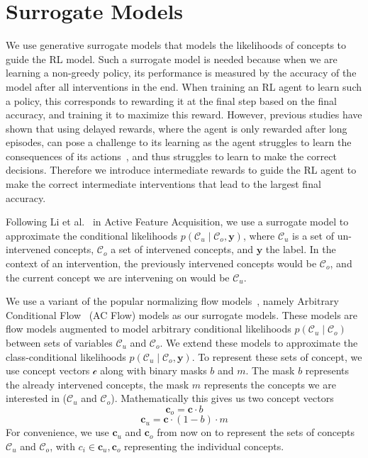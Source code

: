 
\section{Surrogate Models}\label{method:surrogate}

We use generative surrogate models that models the likelihoods of concepts
to guide the RL model. 
Such a surrogate model is needed because
when we are learning
a non-greedy policy, its performance is measured by the accuracy
of the model after all interventions in the end.
When training an RL agent to learn such a policy, this corresponds
to rewarding it at the final step based 
on the final accuracy, and training it to maximize this reward.
However, previous studies have shown that
using delayed rewards, where the agent is only rewarded after long episodes,
can pose a challenge to its learning as the agent struggles to learn
the consequences of its actions~\cite{ steps-towards-ai, temporal-credit-assignment},
and thus struggles to learn to make the correct decisions.
Therefore we introduce intermediate rewards 
to guide the RL agent to make the correct intermediate
interventions that lead 
to the largest final accuracy.

Following Li et al.~\cite{afa} in Active Feature Acquisition,
we use a surrogate model 
to approximate
the conditional likelihoods $p(\mathcal{C}_u \mid \mathcal{C}_o, \mathbf{y})$, 
where $\mathcal{C}_u$ is a set of un-intervened
concepts, $\mathcal{C}_o$ a set of intervened concepts,
and $\mathbf{y}$ the label. 
In the context of an intervention, the previously intervened concepts would be $\mathcal{C}_o$,
and the current concept we are intervening on would be
$\mathcal{C}_u$.

We use a variant of the popular normalizing flow models~\cite{normalizing-flows},
namely Arbitrary Conditional Flow~\cite{acflow} (AC Flow)
models as our surrogate models.
These models are 
flow models augmented to model arbitrary conditional likelihoods $p(\mathcal{C}_u \mid \mathcal{C}_o)$
between sets of variables $\mathcal{C}_u$ and $\mathcal{C}_o$.
We extend these models to approximate the class-conditional
likelihoods
$p(\mathcal{C}_u \mid \mathcal{C}_o, \mathbf{y})$. To represent
these sets of concept,
we use concept vectors $\mathcal{c}$ along with
binary masks $b$ and $m$.
The mask $b$ represents
the already intervened concepts, the mask $m$ represents
the concepts we are interested in ($\mathcal{C}_u$ and $\mathcal{C}_o$).
Mathematically this gives us two concept vectors
\[\mathbf{c}_o = \mathbf{c} \cdot b\]
\[\mathbf{c}_u = \mathbf{c} \cdot (1 - b) \cdot m\]
For convenience, we use $\mathbf{c}_u$ and $\mathbf{c}_o$ from now on
to represent the sets of concepts $\mathcal{C}_u$ and $\mathcal{C}_o$, with
$c_i \in \mathbf{c}_u, \mathbf{c}_o$ representing the individual concepts.

